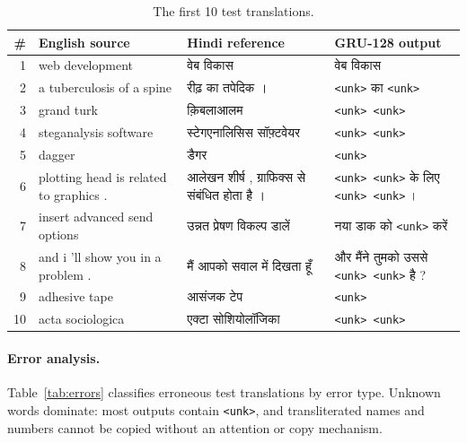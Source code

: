 \documentclass[10pt,a4paper]{article}
\newcommand{\hi}[1]{{\hindifont #1}}
\newcommand{\code}[1]{\texttt{#1}}
\begin{document}
\begin{table}[H]
\centering\small
\begin{tabularx}{\textwidth}{rYYY}
\toprule
\# & English source & Hindi reference & GRU-128 output \\
 & web development & \hi{वेब विकास} & \hi{वेब विकास} \\
2 & a tuberculosis of a spine & \hi{रीढ़ का तपेदिक ।} & \code{<unk>} \hi{का} \code{<unk>} \\
3 & grand turk & \hi{क़िबलाआलम} & \code{<unk> <unk>} \\
4 & steganalysis software & \hi{स्टेगएनालिसिस सॉफ़्टवेयर} & \code{<unk> <unk>} \\
5 & dagger & \hi{डैगर} & \code{<unk>} \\
6 & plotting head is related to graphics . & \hi{आलेखन शीर्ष , ग्राफिक्स से संबंधित होता है ।} & \code{<unk> <unk>} \hi{के लिए} \code{<unk> <unk>} \hi{।} \\
7 & insert advanced send options & \hi{उन्नत प्रेषण विकल्प डालें} & \hi{नया डाक को} \code{<unk>} \hi{करें} \\
8 & and i 'll show you in a problem . & \hi{मैं आपको सवाल में दिखता हूँ} & \hi{और मैंने तुमको उससे} \code{<unk> <unk>} \hi{है ?} \\
9 & adhesive tape & \hi{आसंजक टेप} & \code{<unk>} \\
10 & acta sociologica & \hi{एक्टा सोशियोलॉजिका} & \code{<unk> <unk>} \\
\bottomrule
\end{tabularx}
\caption{The first 10 test translations.}
\label{tab:first10}
\end{table}

\paragraph{Error analysis.} Table~\ref{tab:errors} classifies erroneous test translations by error type.
Unknown words dominate: most outputs contain \code{<unk>}, and transliterated names and numbers cannot be
copied without an attention or copy mechanism.
\end{document}
